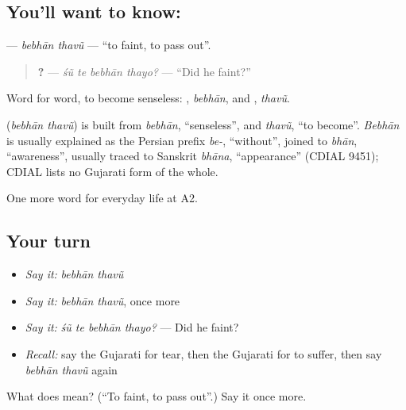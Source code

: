 \subsection*{You'll want to know:  }
\textbf{ } — \emph{bebhān thavũ} — \textquotedblleft{}to faint, to pass out\textquotedblright{}.

\begin{quote}
\textbf{   ?} — \emph{śũ te bebhān thayo?} — \textquotedblleft{}Did he faint?\textquotedblright{}
\end{quote}

Word for word, to become senseless: \textbf{}, \emph{bebhān}, and \textbf{}, \emph{thavũ}.

\begin{cousinweb}
\textbf{ } (\emph{bebhān thavũ}) is built from \emph{bebhān}, \textquotedblleft{}senseless\textquotedblright{}, and \emph{thavũ}, \textquotedblleft{}to become\textquotedblright{}. \emph{Bebhān} is usually explained as the Persian prefix \emph{be-}, \textquotedblleft{}without\textquotedblright{}, joined to \emph{bhān}, \textquotedblleft{}awareness\textquotedblright{}, usually traced to Sanskrit \emph{bhāna}, \textquotedblleft{}appearance\textquotedblright{} (CDIAL 9451); CDIAL lists no Gujarati form of the whole.
\end{cousinweb}

\begin{grammarlens}[title={What you've built}]
One more word for everyday life at A2.
\end{grammarlens}

\subsection*{Your turn}
\begin{itemize}
\raggedright
  \item \emph{Say it:} \emph{bebhān thavũ}
  \item \emph{Say it:} \emph{bebhān thavũ}, once more
  \item \emph{Say it:} \emph{śũ te bebhān thayo?} — Did he faint?
  \item \emph{Recall:} say the Gujarati for tear, then the Gujarati for to suffer, then say \emph{bebhān thavũ} again
\end{itemize}

\begin{tcolorbox}[breakable,colback=teal!4,colframe=teal!35!black,title={Before you move on}]
What does   mean? (\textquotedblleft{}To faint, to pass out\textquotedblright{}.) Say it once more.
\end{tcolorbox}
